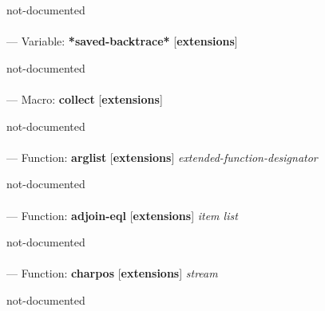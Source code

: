 \begin{adjustwidth}{5em}{5em}
not-documented
\end{adjustwidth}

\paragraph{}
\label{EXTENSIONS:*SAVED-BACKTRACE*}
--- Variable: \textbf{*saved-backtrace*} [\textbf{extensions}] \textit{}

\begin{adjustwidth}{5em}{5em}
not-documented
\end{adjustwidth}

\paragraph{}
\label{EXTENSIONS:COLLECT}
--- Macro: \textbf{collect} [\textbf{extensions}] \textit{}

\begin{adjustwidth}{5em}{5em}
not-documented
\end{adjustwidth}

\paragraph{}
\label{EXTENSIONS:ARGLIST}
--- Function: \textbf{arglist} [\textbf{extensions}] \textit{extended-function-designator}

\begin{adjustwidth}{5em}{5em}
not-documented
\end{adjustwidth}

\paragraph{}
\label{EXTENSIONS:ADJOIN-EQL}
--- Function: \textbf{adjoin-eql} [\textbf{extensions}] \textit{item list}

\begin{adjustwidth}{5em}{5em}
not-documented
\end{adjustwidth}

\paragraph{}
\label{EXTENSIONS:CHARPOS}
--- Function: \textbf{charpos} [\textbf{extensions}] \textit{stream}

\begin{adjustwidth}{5em}{5em}
not-documented
\end{adjustwidth}

